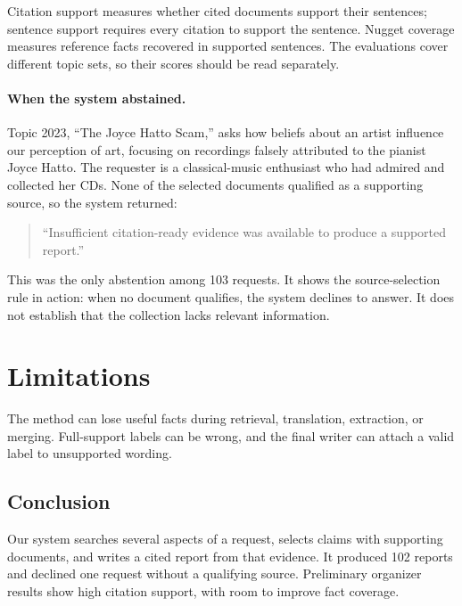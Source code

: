 \documentclass[11pt,letterpaper]{article}
\begin{document}
Citation support measures whether cited documents support their sentences; sentence support requires every citation to support the sentence. Nugget coverage measures reference facts recovered in supported sentences. The evaluations cover different topic sets, so their scores should be read separately.

\begin{samepage}
\paragraph{When the system abstained.}
Topic 2023, ``The Joyce Hatto Scam,'' asks how beliefs about an artist influence our perception of art, focusing on recordings falsely attributed to the pianist Joyce Hatto. The requester is a classical-music enthusiast who had admired and collected her CDs. None of the selected documents qualified as a supporting source, so the system returned:
\begin{quote}
``Insufficient citation-ready evidence was available to produce a supported report.''
\end{quote}
This was the only abstention among 103 requests. It shows the source-selection rule in action: when no document qualifies, the system declines to answer. It does not establish that the collection lacks relevant information.

\end{samepage}

\section{Limitations}
The method can lose useful facts during retrieval, translation, extraction, or merging. Full-support labels can be wrong, and the final writer can attach a valid label to unsupported wording.

\begin{samepage}
\section{Conclusion}
Our system searches several aspects of a request, selects claims with supporting documents, and writes a cited report from that evidence. It produced 102 reports and declined one request without a qualifying source. Preliminary organizer results show high citation support, with room to improve fact coverage.

\end{samepage}
\end{document}
